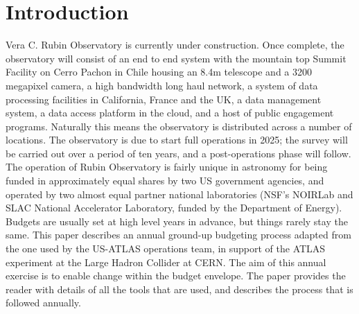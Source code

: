 \section{Introduction} \label{sec:intro}
Vera C. Rubin Observatory\cite{2008arXiv0805.2366I} is currently under construction. 
Once complete, the observatory will consist of an end to end system with the mountain top Summit Facility on Cerro Pachon in Chile housing an 8.4m telescope and a 3200 megapixel camera, a high bandwidth long haul network, a system of data processing facilities in California, France and the UK, a data management system, a data access platform in the cloud, and a host of public engagement programs. 
Naturally this means the observatory is distributed across a number of locations. 
The observatory is due to start full operations in 2025; the survey will be carried out over a period of ten years, and a post-operations phase will follow. 
The operation of Rubin Observatory is fairly unique in astronomy for being funded in approximately equal shares by two US government agencies, and operated by two almost equal partner national laboratories (NSF's NOIRLab and SLAC National Accelerator Laboratory, funded by the Department of Energy). 
Budgets are usually set at high level years in advance, but things rarely stay the same.
This paper describes an annual ground-up budgeting process adapted from the one used by the US-ATLAS operations team, in support of the ATLAS experiment at the Large Hadron Collider at CERN. 
The aim of this annual exercise is to enable change within the budget envelope.
The paper provides the reader with details of all the tools that are used, and describes the process that is followed annually.

